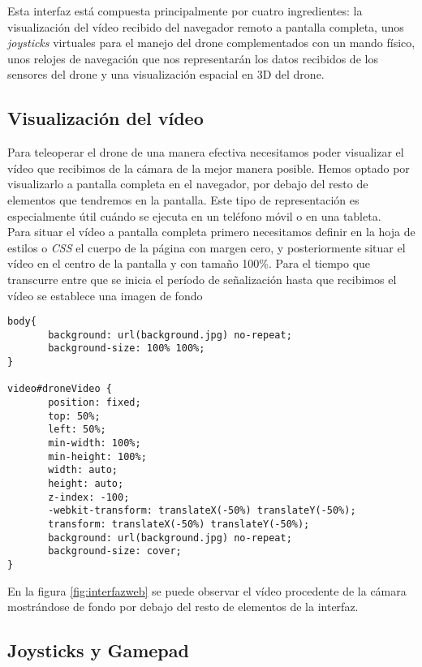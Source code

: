 Esta interfaz está compuesta principalmente por cuatro ingredientes: la visualización del vídeo recibido del navegador remoto a pantalla completa, unos \emph{joysticks} virtuales para el manejo del drone complementados con un mando físico, unos relojes de navegación que nos representarán los datos recibidos de los sensores del drone y una visualización espacial en 3D del drone.\\

\subsection{Visualización del vídeo}

Para teleoperar el drone de una manera efectiva necesitamos poder visualizar el vídeo que recibimos de la cámara de la mejor manera posible. Hemos optado por visualizarlo a pantalla completa en el navegador, por debajo del resto de elementos que tendremos en la pantalla. Este tipo de representación es especialmente útil cuándo se ejecuta en un teléfono móvil o en una tableta.\\

Para situar el vídeo a pantalla completa primero necesitamos definir en la hoja de estilos o \emph{CSS} el cuerpo de la página con margen cero, y posteriormente situar el vídeo en el centro de la pantalla y con tamaño 100\%. Para el tiempo que transcurre entre que se inicia el período de señalización hasta que recibimos el vídeo se establece una imagen de fondo\\

\begin{lstlisting}[caption=Vídeo a pantalla completa.]
body{
       background: url(background.jpg) no-repeat;
       background-size: 100% 100%;
}

video#droneVideo { 
       position: fixed;
       top: 50%;
       left: 50%;
       min-width: 100%;
       min-height: 100%;
       width: auto;
       height: auto;
       z-index: -100;
       -webkit-transform: translateX(-50%) translateY(-50%);
       transform: translateX(-50%) translateY(-50%);
       background: url(background.jpg) no-repeat;
       background-size: cover; 
}
\end{lstlisting}

En la figura \ref{fig:interfazweb} se puede observar el vídeo procedente de la cámara mostrándose de fondo por debajo del resto de elementos de la interfaz.\\

\subsection{Joysticks y Gamepad}\label{subsec:joysticks}

